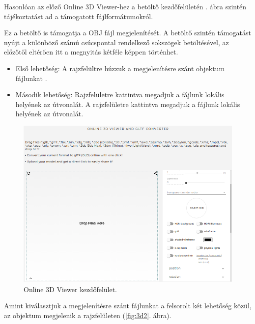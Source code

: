 Hasonlóan az előző Online 3D Viewer-hez a betöltő kezdőfelületén . ábra szintén tájékoztatást ad a támogatott fájlformátumokról.

Ez a betöltő is támogatja a OBJ fájl megjelenítését. A betöltő szintén támogatást nyújt a különböző számú csúcspontal rendelkező sokszögek betöltésével, az előzőtől eltérően itt a megnyitás kétféle képpen történhet.
\begin{itemize}
\item Első lehetőség:
A rajzfelültre húzzuk a megjelenítésre szánt objektum fájlunkat .
\item Második lehetőség:
Rajzfelületre kattintva megadjuk a fájlunk lokális helyének az útvonalát.
A rajzfelületre kattintva megadjuk a fájlunk lokális helyének az útvonalát.
\end{itemize}

\begin{figure}[h]
	\centering
	\includegraphics[width=\textwidth]{images/3D_creators.png}
	\caption{Online 3D Viewer kezdőfelület.}
	\label{fig:3d1}
\end{figure}
\newpage
Amint kiválasztjuk a megjelenítésre szánt fájlunkat a felsorolt két lehetőség közül, az objektum megjelenik a rajzfelületen (\ref{fig:3d2}. ábra).

